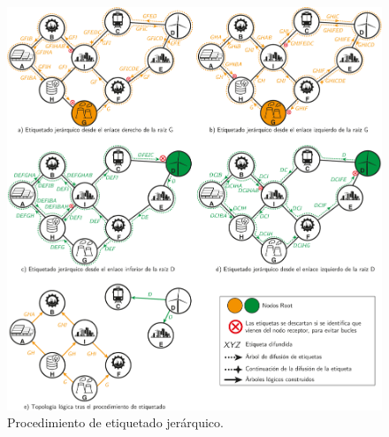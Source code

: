 \begin{figure}[ht!]
    \centering
    \includegraphics[width=\textwidth]{fig/07_bloste/bloste_03.pdf}
    \caption{Procedimiento de etiquetado jerárquico.}
    \label{fig:bloste_03}
\end{figure}

